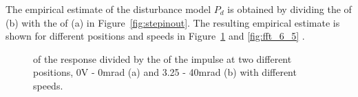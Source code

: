 The empirical estimate of the disturbance model $P_d$ is obtained by dividing the \abbrFFT of (b) with the \abbrFFT of (a) in Figure~\ref{fig:stepinout}. The resulting empirical estimate is shown for different positions and speeds in Figure~\ref{fig:fft0_3} and \ref{fig:fft_6_5} .

\begin{figure}[h!]
  \centering %
  \qquad
  \caption{\label{fig:fft0_3} \abbrFFT of the response divided by the \abbrFFT of the impulse at two different positions, 0V - 0mrad (a) and 3.25 - 40mrad (b) with different speeds.}
\end{figure}

